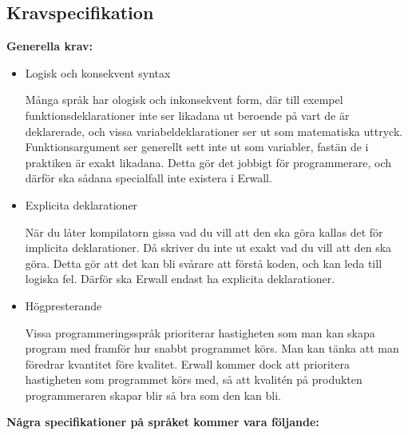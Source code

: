 \documentclass{theme}
\begin{document}
\subsection{Kravspecifikation}

\textbf{Generella krav:}

\begin{itemize}
	\item Logisk och konsekvent syntax

		Många språk har ologisk och inkonsekvent form, där till exempel
		funktionsdeklarationer inte ser likadana ut beroende på vart de
		är deklarerade, och vissa variabeldeklarationer ser ut som matematiska
		uttryck. Funktionsargument ser generellt sett inte ut som variabler,
		fastän de i praktiken är exakt likadana. Detta gör det jobbigt för
		programmerare, och därför ska sådana specialfall inte existera i Erwall.

	\item Explicita deklarationer

		När du låter kompilatorn gissa vad du vill att den ska göra kallas det
		för implicita deklarationer. Då skriver du inte ut exakt vad du vill att
		den ska göra. Detta gör att det kan bli svårare att förstå koden, och
		kan leda till logiska fel. Därför ska Erwall endast ha explicita
		deklarationer.

	\item Högpresterande

		Vissa programmeringsspråk prioriterar hastigheten som man kan skapa
		program med framför hur snabbt programmet körs. Man kan tänka att man
		föredrar kvantitet före kvalitet. Erwall kommer dock att prioritera
		hastigheten som programmet körs med, så att kvalitén på produkten
		programmeraren skapar blir så bra som den kan bli.\\

\end{itemize}

\noindent \textbf{Några specifikationer på språket kommer vara följande:}
\end{document}
